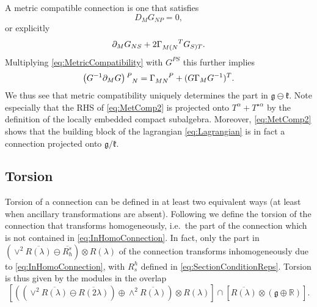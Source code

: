 A metric compatible connection is one that satisfies 
\begin{equation}
    D_M G_{NP} = 0,
\end{equation}
or explicitly
\begin{equation}\label{eq:MetricCompatibility}
    \pd_M G_{NS} + 2\tensor{\Gamma}{_{M(N}^T}G_{S)T}.
\end{equation}
Multiplying \eqref{eq:MetricCompatibility} with $G^{PS}$ this further implies 
\begin{equation}\label{eq:MetComp2}
    \left(G^{-1}\pd_MG\right)\tensor{}{^P_N} = \tensor{\Gamma}{_{MN}^P}+(G\Gamma_MG^{-1})^T.
\end{equation}
We thus see that metric compatibility uniquely determines the part in $\mathfrak{g}\ominus\mathfrak{k}$. Note especially that the RHS of \eqref{eq:MetComp2} is projected onto $T^\alpha+T^{\star\alpha}$ by the definition of the locally embedded compact subalgebra. Moreover, \eqref{eq:MetComp2} shows that the building block of the lagrangian \eqref{eq:Lagrangian} is in fact a connection projected onto $\mathfrak{g}/\mathfrak{k}$. 

\subsection{Torsion}
Torsion of a connection can be defined in at least two equivalent ways (at least when ancillary transformations are absent). Following \cite{Cederwall:2013naa} we define the torsion of the connection that transforms homogeneously, i.e.\ the part of the connection which is not contained in \eqref{eq:InHomoConnection}. In fact, only the part in $\left(\vee^2\overbar{R(\lambda)}\ominus \overbar{R_h^s}\right)\otimes R(\lambda)$ of the connection transforms inhomogeneously due to \eqref{eq:InHomoConnection}, with $R_s^h$ defined in \eqref{eq:SectionConditionReps}. Torsion is thus given by the modules in the overlap 
\begin{equation}
    \left[\left(\left(\vee^2\overbar{R(\lambda)}\ominus\overbar{R(2\lambda)}\right)\oplus\wedge^2\overbar{R(\lambda)}\right)\otimes R(\lambda)\right] \cap \left[\overbar{R(\lambda)}\otimes \left(\mathfrak{g}\oplus \mathbb{R}\right)\right].
\end{equation}


